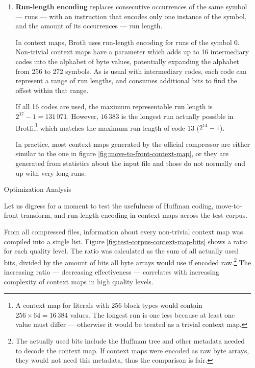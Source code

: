 \documentclass[english,master,dept460,male,cpp,cpdeclaration]{diploma}
\makeatletter
\renewcommand\paragraph
	{\@startsection{paragraph}{4}{\z@}
	{-3.25ex plus 1ex minus .2ex}
	{1.5ex plus .2ex}
	{\normalfont\normalsize\bfseries}}
\newcommand{\subfoursection}[1]{\paragraph{#1}}
\makeatother
\begin{document}
\begin{enumerate}
			\item \textbf{Run-length encoding}\cite{DataCompressionCompleteReference} replaces consecutive occurrences of the same symbol --- runs --- with an instruction that encodes only one instance of the symbol, and the amount of its occurrences --- run length.
			
			In context maps, Brotli uses run-length encoding for runs of the symbol $0$. Non-trivial context maps have a parameter which adds up to 16 intermediary codes into the alphabet of byte values, potentially expanding the alphabet from 256 to 272 symbols. As is usual with intermediary codes, each code can represent a range of run lengths, and consumes additional bits to find the offset within that range.
			
			If all 16 codes are used, the maximum representable run length is $2^{17} - 1 = 131\,071$. However, $16\,383$ is the longest run actually possible in Brotli,\footnote{A context map for literals with 256 block types would contain $256 \times 64 = 16\,384$ values. The longest run is one less because at least one value must differ --- otherwise it would be treated as a trivial context map.} which matches the maximum run length of code 13 ($2^{14} - 1$).
			
			In practice, most context maps generated by the official compressor are either similar to the one in figure \ref{fig:move-to-front-context-map}, or they are generated from statistics about the input file and those do not normally end up with very long runs.
		\end{enumerate}
		
			\subfoursection{Optimization Analysis}
			
			Let us digress for a moment to test the usefulness of Huffman coding, move-to-front transform, and run-length encoding in context maps across the test corpus.
			
			From all compressed files, information about every non-trivial context map was compiled into a single list. Figure \ref{fig:test-corpus-context-map-bits} shows a ratio for each quality level. The ratio was calculated as the sum of all actually used bits, divided by the amount of bits all byte arrays would use if encoded raw.\footnote{The actually used bits include the Huffman tree and other metadata needed to decode the context map. If context maps were encoded as raw byte arrays, they would not need this metadata, thus the comparison is fair.} The increasing ratio --- decreasing effectiveness --- correlates with increasing complexity of context maps in high quality levels.
			
\end{document}
